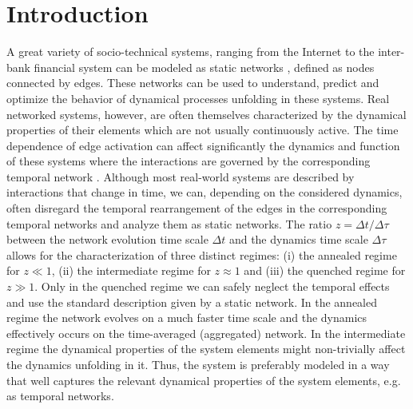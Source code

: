 \documentclass[%
 reprint,
 amsmath,amssymb,
 aps,
]{revtex4-2}
\begin{document}
\maketitle




\section{\label{sec:intro}Introduction}
A great variety of socio-technical systems, ranging from the Internet to the inter-bank financial system can be modeled as static networks  \cite{pastor2007evolution,battiston2010structure}, defined as nodes connected by edges. 
These networks can be used to understand, predict and optimize the behavior of dynamical processes unfolding in these systems. 
Real networked systems, however, are often themselves characterized by the dynamical properties of their elements which are not usually continuously active. The time dependence of edge activation can affect significantly the dynamics and function of these systems where the interactions are governed by the corresponding temporal network \cite{holme2012temporal,scholtes2014causality}.
Although most real-world systems are described by interactions that change in time, we can, depending on the considered dynamics, often disregard the temporal rearrangement of the edges in the corresponding temporal networks and analyze them as static networks. 
The ratio $z=\Delta t/\Delta\tau$ between the network evolution time scale $\Delta t$ and the dynamics time scale $\Delta\tau$ allows for the characterization of three distinct regimes: (i) the annealed regime for $z \ll 1$, (ii) the intermediate regime for $z \approx 1$ and (iii) the quenched regime for $z \gg 1$. Only in the quenched regime we can safely neglect the temporal effects and use the standard description given by a static network. In the annealed regime the network evolves on a much faster time scale and the dynamics effectively occurs on the time-averaged (aggregated) network. In the intermediate regime the dynamical properties of the system elements might non-trivially affect the dynamics unfolding in it.
Thus, the system is preferably modeled in a way that well captures the relevant dynamical properties of the system elements, e.g. as temporal networks.
\end{document}
